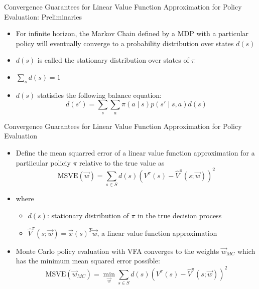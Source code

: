 \begin{frame}[c]{Convergence Guarantees for Linear Value Function	Approximation for Policy Evaluation: Preliminaries}
	
	\begin{itemize}
		\item For infinite horizon, the Markov Chain defined by a MDP with a particular policy will eventually converge to a probability distribution over states $d(s)$
		\item $d(s)$ is called the stationary distribution over states of $\pi$
		\item $\sum_{s} d(s) = 1$
		\item $d(s)$ statisfies the following balance equation:
		$$ d(s') = \sum_{s} \sum_{a} \pi(a \mid s) p(s' \mid s,a) d(s) $$
	\end{itemize}
	
\end{frame}
\begin{frame}[c]{Convergence Guarantees for Linear Value Function
		Approximation for Policy Evaluation }
	
	\begin{itemize}
		\item Define the mean squarred error of a linear value function approximation for a partiicular policiy $\pi$  relative to the true value as 
		$$\text{MSVE}(\vec{w}) = \sum_{s \in S} d(s) (V^\pi (s) - \hat{V}^\pi(s;\vec{w}))^2 $$
		\item where
		\begin{itemize}
			\item $d(s)$: stationary distribution of $\pi$ in the true decision process
			\item $\hat{V}^\pi(s;\vec{w}) = \vec{x}(s)^T\vec{w}$, a linear value function approximation
		\end{itemize}
		\item Monte Carlo policy evaluation with VFA converges to the weights $\vec{w}_{MC}$ which has the minimum mean squared error possible:
		$$\text{MSVE}(\vec{w}_{MC}) = \min_{\vec{w}}\sum_{s \in S} d(s) (V^\pi (s) - \hat{V}^\pi(s;\vec{w}))^2 $$
	\end{itemize}
	
\end{frame}

